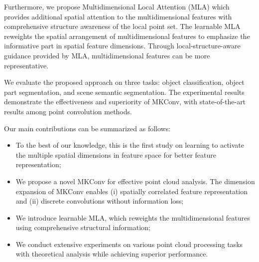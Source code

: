 \documentclass[preprint,12pt]{elsarticle}
\begin{document}
Furthermore, we propose Multidimensional Local Attention (MLA) which provides additional spatial attention to the multidimensional features with comprehensive structure awareness of the local point set. The learnable MLA reweights the spatial arrangement of multidimensional features to emphasize the informative part in spatial feature dimensions. Through local-structure-aware guidance provided by MLA, multidimensional features can be more representative. 

We evaluate the proposed approach on three tasks: object classification, object part segmentation, and scene semantic segmentation. The experimental results demonstrate the effectiveness and superiority of MKConv, with state-of-the-art results among point convolution methods.

Our main contributions can be summarized as follows:

\begin{itemize}
	\setlength{\itemsep}{0ex}
	\item To the best of our knowledge, this is the first study on learning to activate the multiple spatial dimensions in feature space for better feature representation;
	\item We propose a novel MKConv for effective point cloud analysis. The dimension expansion of MKConv enables (i) spatially correlated feature representation and (ii) discrete convolutions without information loss;
	\item We introduce learnable MLA, which reweights the multidimensional features using comprehensive structural information;
	\item We conduct extensive experiments on various point cloud processing tasks with theoretical analysis while achieving superior performance.
\end{itemize} 
\end{document}
